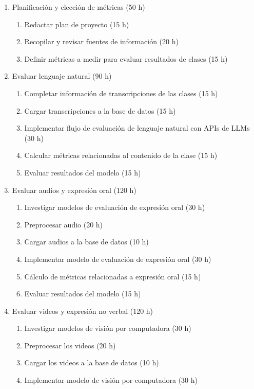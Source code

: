 \documentclass[
11pt, %
codirector, %
]{charter}
\begin{document}
\begin{enumerate}
\item Planificación y elección de métricas (50 h)
    \begin{enumerate}
    \item Redactar plan de proyecto (15 h)
    \item Recopilar y revisar fuentes de información (20 h)
    \item Definir métricas a medir para evaluar resultados de clases (15 h)
    \end{enumerate}
\item Evaluar lenguaje natural (90 h)
    \begin{enumerate}
    \item Completar información de transcripciones de las clases (15 h)
    \item Cargar transcripciones a la base de datos (15 h)
    \item Implementar flujo de evaluación de lenguaje natural con APIs de LLMs (30 h)
    \item Calcular métricas relacionadas al contenido de la clase (15 h)
    \item Evaluar resultados del modelo (15 h)
    \end{enumerate}
\item Evaluar audios y expresión oral (120 h)
    \begin{enumerate}
    \item Investigar modelos de evaluación de expresión oral (30 h)
    \item Preprocesar audio (20 h)
    \item Cargar audios a la base de datos (10 h)
    \item Implementar modelo de evaluación de expresión oral (30 h)
    \item Cálculo de métricas relacionadas a expresión oral (15 h)
    \item Evaluar resultados del modelo (15 h)
    \end{enumerate}
\item Evaluar videos y expresión no verbal (120 h)
    \begin{enumerate}
    \item Investigar modelos de visión por computadora (30 h)
    \item Preprocesar los videos (20 h)
    \item Cargar los videos a la base de datos (10 h)
    \item Implementar modelo de visión por computadora (30 h)

\end{enumerate}
\end{enumerate}
\end{document}
